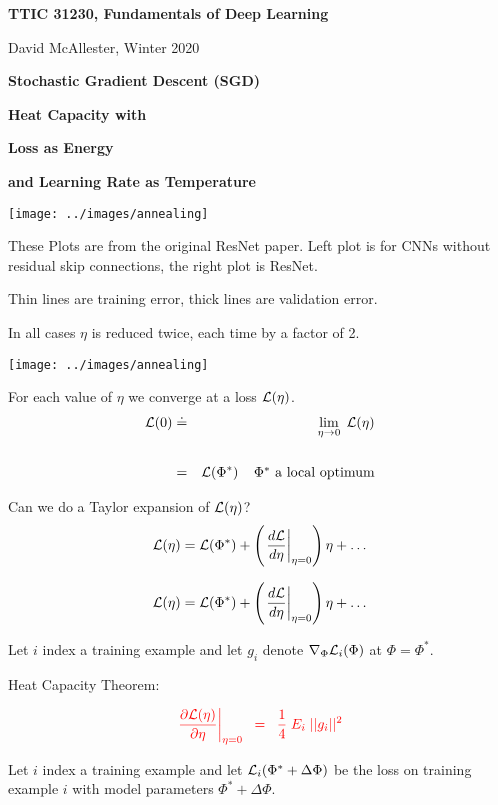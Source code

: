 




{\Huge
  \centerline{\bf TTIC 31230, Fundamentals of Deep Learning}
  \bigskip
  \centerline{David McAllester, Winter 2020}
  \vfill
  \centerline{\bf Stochastic Gradient Descent (SGD)}
  \vfill
  \centerline{\bf Heat Capacity with}
  \vfill
  \centerline{\bf Loss as Energy}
  \vfill
  \centerline{\bf and Learning Rate as Temperature}
  \vfill
  \vfill
  \vfill


\centerline{\texttt{[image: ../images/annealing]}}

\vfill
These Plots are from the original ResNet paper.  Left plot is for CNNs without residual skip connections, the right plot is ResNet.

\vfill
Thin lines are training error, thick lines are validation error.

\vfill
In all cases $\eta$ is reduced twice, each time by a factor of 2.


\centerline{\texttt{[image: ../images/annealing]}}
For each value of $\eta$ we converge at a loss ${\cal L}(\eta)$.
\begin{eqnarray*}
{\cal L}(0) & \doteq & \lim_{\eta \rightarrow 0}\;{\cal L}(\eta) \\
\\
& = & {\cal L}(\Phi^*)\;\;\;\;\mbox{$\Phi^*$ a local optimum}
\end{eqnarray*}

\vfill
Can we do a Taylor expansion of ${\cal L}(\eta)$?
$${\cal L}(\eta) = {\cal L}(\Phi^*) + \left(\left.\frac{d{\cal L}}{d \eta}\right|_{\eta = 0}\right)\eta + \ldots$$


$${\cal L}(\eta) = {\cal L}(\Phi^*) + \left(\left.\frac{d{\cal L}}{d \eta}\right|_{\eta = 0}\right)\eta + \ldots$$

\vfill
Let $i$ index a training example and let $g_i$ denote $\nabla_\Phi {\cal L}_i(\Phi)$ at $\Phi = \Phi^*$.

\vfill
Heat Capacity Theorem:

\vfill
$${\color{red} \left.\frac{\partial {\cal L}(\eta)}{\partial \eta}\right|_{\eta = 0} \;\;=\;\; \frac{1}{4}\; E_i\; ||g_i||^2}$$


\vfill
Let $i$ index a training example and let ${\cal L}_i(\Phi^* + \Delta \Phi)$ be the loss on training example $i$
with model parameters $\Phi^* + \Delta\Phi$. 

}

